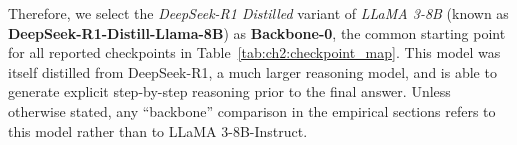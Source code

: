 Therefore, we select the \textit{DeepSeek-R1 Distilled} variant of \textit{LLaMA 3-8B} (known as \textbf{DeepSeek-R1-Distill-Llama-8B}) as \textbf{Backbone-0}, the common starting point for all reported checkpoints in Table~\ref{tab:ch2:checkpoint_map}. This model was itself distilled from DeepSeek-R1, a much larger reasoning model, and is able to generate explicit step-by-step reasoning prior to the final answer. Unless otherwise stated, any ``backbone'' comparison in the empirical sections refers to this model rather than to LLaMA 3-8B-Instruct.






















